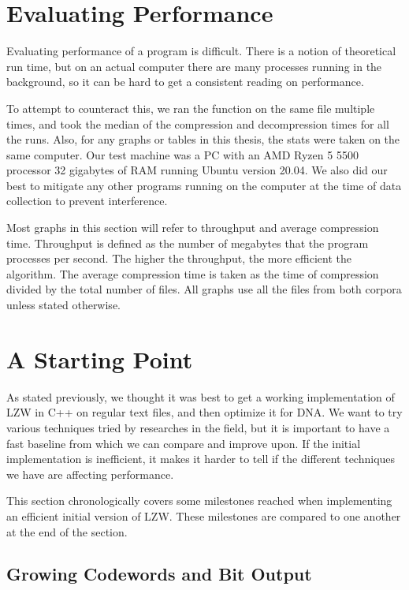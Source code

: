 \documentclass[12pt,twoside]{reedthesis}
\begin{document}
\hypertarget{evaluating-performance}{%
\section{Evaluating Performance}\label{evaluating-performance}}

Evaluating performance of a program is difficult. There is a notion of theoretical run time, but on an actual computer there are many processes running in the background, so it can be hard to get a consistent reading on performance.

To attempt to counteract this, we ran the function on the same file multiple times, and took the median of the compression and decompression times for all the runs. Also, for any graphs or tables in this thesis, the stats were taken on the same computer. Our test machine was a PC with an AMD Ryzen 5 5500 processor 32 gigabytes of RAM running Ubuntu version 20.04. We also did our best to mitigate any other programs running on the computer at the time of data collection to prevent interference.

Most graphs in this section will refer to throughput and average compression time. Throughput is defined as the number of megabytes that the program processes per second. The higher the throughput, the more efficient the algorithm. The average compression time is taken as the time of compression divided by the total number of files. All graphs use all the files from both corpora unless stated otherwise.

\hypertarget{a-starting-point}{%
\section{A Starting Point}\label{a-starting-point}}

As stated previously, we thought it was best to get a working implementation of LZW in C++ on regular text files, and then optimize it for DNA. We want to try various techniques tried by researches in the field, but it is important to have a fast baseline from which we can compare and improve upon. If the initial implementation is inefficient, it makes it harder to tell if the different techniques we have are affecting performance.

This section chronologically covers some milestones reached when implementing an efficient initial version of LZW. These milestones are compared to one another at the end of the section.

\hypertarget{growing-codewords-and-bit-output}{%
\subsection{Growing Codewords and Bit Output}\label{growing-codewords-and-bit-output}}
\end{document}
